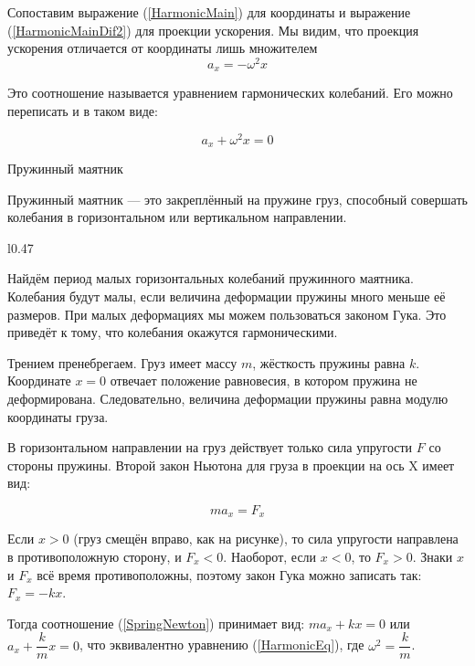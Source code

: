 \documentclass[a4paper,12pt]{article} %
\begin{document}
Сопоставим выражение (\ref{HarmonicMain}) для координаты и выражение (\ref{HarmonicMainDif2}) для проекции ускорения. 
Мы видим, что проекция ускорения отличается от координаты лишь множителем
\begin{equation} 
a_x = -\omega^2 x
\end{equation}

Это соотношение называется уравнением гармонических колебаний. Его можно
переписать и в таком виде:

\begin{equation} \label{HarmonicEq}
a_x + \omega^2 x = 0
\end{equation}

\begin{center}
\large Пружинный маятник
\end{center}

Пружинный маятник — это закреплённый на пружине груз, способный совершать
колебания в горизонтальном или вертикальном направлении.
\begin{wrapfigure}{l}{0.47\textwidth}
	\vspace{-4ex}
	
	\vspace{-5ex}
\end{wrapfigure}
Найдём период малых горизонтальных колебаний пружинного маятника.
Колебания будут малы, если величина деформации пружины много меньше её
размеров. При малых деформациях мы можем пользоваться законом Гука. Это
приведёт к тому, что колебания окажутся гармоническими.

Трением пренебрегаем. Груз имеет массу $m$, жёсткость пружины равна $k$.
Координате $x = 0$ отвечает положение равновесия, в котором пружина не
деформирована. Следовательно, величина деформации пружины равна модулю
координаты груза.

В горизонтальном направлении на груз действует только сила упругости $F$ со
стороны пружины. Второй закон Ньютона для груза в проекции на ось X имеет вид:

\begin{equation} \label{SpringNewton}
	ma_x=F_x
\end{equation}

Если $x > 0$ (груз смещён вправо, как на рисунке), то сила упругости направлена в
противоположную сторону, и $F_x < 0$. Наоборот, если $x < 0$, то $F_x > 0$. Знаки $x$ и $F_x$ всё
время противоположны, поэтому закон Гука можно записать так: $F_x = -kx$.

\pagebreak
Тогда соотношение (\ref{SpringNewton}) принимает вид: $ma_x+kx=0$ или $a_x+\dfrac{k}{m}x=0$, что эквивалентно уравнению (\ref{HarmonicEq}),
где $\omega^2=\dfrac{k}{m}$.
\end{document}
